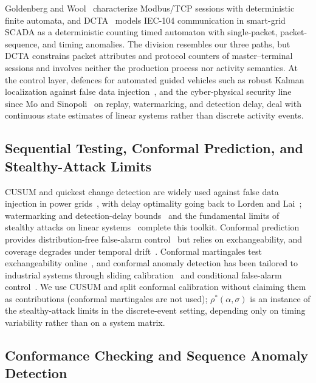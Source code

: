 \documentclass[manuscript,screen,review]{acmart}
\begin{document}
Goldenberg and Wool~\cite{goldenberg2013modbus} characterize {Modbus}/{TCP} sessions with deterministic finite automata, and DCTA~\cite{barsha2024dcta} models {IEC-104} communication in smart-grid {SCADA} as a deterministic counting timed automaton with single-packet, packet-sequence, and timing anomalies. The division resembles our three paths, but DCTA constrains packet attributes and protocol counters of master--terminal sessions and involves neither the production process nor activity semantics. At the control layer, defences for automated guided vehicles such as robust Kalman localization against false data injection~\cite{elsisi2023agv}, and the cyber-physical security line since Mo and Sinopoli~\cite{mo2009replay} on replay, watermarking, and detection delay, deal with continuous state estimates of linear systems rather than discrete activity events.

\subsection{Sequential Testing, Conformal Prediction, and Stealthy-Attack Limits}
\label{sec:rw_tools}

{CUSUM} and quickest change detection are widely used against false data injection in power grids~\cite{li2015quickest}, with delay optimality going back to {Lorden} and {Lai}~\cite{lorden1971procedures,lai1998information}; watermarking and detection-delay bounds~\cite{naha2023watermark} and the fundamental limits of stealthy attacks on linear systems~\cite{liu2022limits} complete this toolkit. Conformal prediction provides distribution-free false-alarm control~\cite{shafer2008conformal,angelopoulos2023conformal} but relies on exchangeability, and coverage degrades under temporal drift~\cite{barber2023exchangeability}. Conformal martingales test exchangeability online~\cite{vovk2003testing,volkhonskiy2017inductive}, and conformal anomaly detection has been tailored to industrial systems through sliding calibration~\cite{yuan2026conformal} and conditional false-alarm control~\cite{kundacina2025conformal}. We use {CUSUM} and split conformal calibration without claiming them as contributions (conformal martingales are not used); $\rho^*(\alpha,\sigma)$ is an instance of the stealthy-attack limits in the discrete-event setting, depending only on timing variability rather than on a system matrix.

\subsection{Conformance Checking and Sequence Anomaly Detection}
\label{sec:rw_pm}
\end{document}
